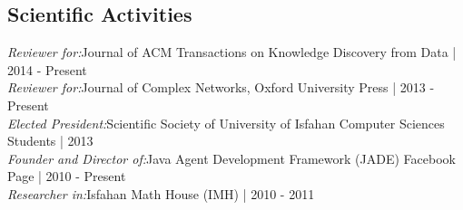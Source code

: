 \documentclass[letter]{res}
\begin{document}
\begin{resume}


\section{Scientific Activities}
{\sl Reviewer for:}Journal of ACM Transactions on Knowledge Discovery from Data | 2014 - Present\\
{\sl Reviewer for:}Journal of Complex Networks, Oxford University Press | 2013 - Present\\
{\sl Elected President:}Scientific Society of University of Isfahan Computer Sciences Students | 2013\\
{\sl Founder and Director of:}Java Agent Development Framework (JADE) Facebook Page | 2010 - Present\\
{\sl Researcher in:}Isfahan Math House (IMH) | 2010 - 2011




\centerline{}

\end{resume}
\end{document}
